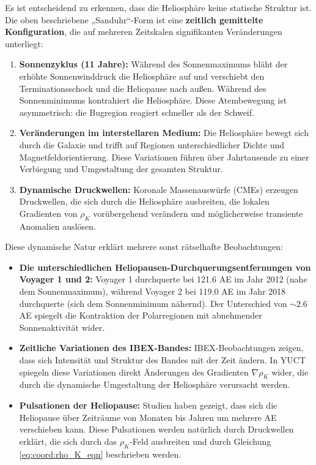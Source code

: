\documentclass[12pt,a4paper]{article}
\theoremstyle{remark}
\begin{document}
	Es ist entscheidend zu erkennen, dass die Heliosphäre keine statische Struktur ist. Die oben beschriebene „Sanduhr“-Form ist eine \textbf{zeitlich gemittelte Konfiguration}, die auf mehreren Zeitskalen signifikanten Veränderungen unterliegt:
	
	\begin{enumerate}
		\item \textbf{Sonnenzyklus (11 Jahre):} Während des Sonnenmaximums bläht der erhöhte Sonnenwinddruck die Heliosphäre auf und verschiebt den Terminationsschock und die Heliopause nach außen. Während des Sonnenminimums kontrahiert die Heliosphäre. Diese Atembewegung ist asymmetrisch: die Bugregion reagiert schneller als der Schweif.
		
		\item \textbf{Veränderungen im interstellaren Medium:} Die Heliosphäre bewegt sich durch die Galaxie und trifft auf Regionen unterschiedlicher Dichte und Magnetfeldorientierung. Diese Variationen führen über Jahrtausende zu einer Verbiegung und Umgestaltung der gesamten Struktur.
		
		\item \textbf{Dynamische Druckwellen:} Koronale Massenauswürfe (CMEs) erzeugen Druckwellen, die sich durch die Heliosphäre ausbreiten, die lokalen Gradienten von $\rho_K$ vorübergehend verändern und möglicherweise transiente Anomalien auslösen.
	\end{enumerate}
	
	Diese dynamische Natur erklärt mehrere sonst rätselhafte Beobachtungen:
	\begin{itemize}
		\item \textbf{Die unterschiedlichen Heliopausen-Durchquerungsentfernungen von Voyager 1 und 2:} Voyager 1 durchquerte bei 121.6 AE im Jahr 2012 (nahe dem Sonnenmaximum), während Voyager 2 bei 119.0 AE im Jahr 2018 durchquerte (sich dem Sonnenminimum nähernd). Der Unterschied von $\sim2.6$ AE spiegelt die Kontraktion der Polarregionen mit abnehmender Sonnenaktivität wider.
		
		\item \textbf{Zeitliche Variationen des IBEX-Bandes:} IBEX-Beobachtungen zeigen, dass sich Intensität und Struktur des Bandes mit der Zeit ändern. In YUCT spiegeln diese Variationen direkt Änderungen des Gradienten $\nabla \rho_K$ wider, die durch die dynamische Umgestaltung der Heliosphäre verursacht werden.
		
		\item \textbf{Pulsationen der Heliopause:} Studien haben gezeigt, dass sich die Heliopause über Zeiträume von Monaten bis Jahren um mehrere AE verschieben kann. Diese Pulsationen werden natürlich durch Druckwellen erklärt, die sich durch das $\rho_K$-Feld ausbreiten und durch Gleichung \eqref{eq:coord:rho_K_eqn} beschrieben werden.
	\end{itemize}
	
\end{document}
